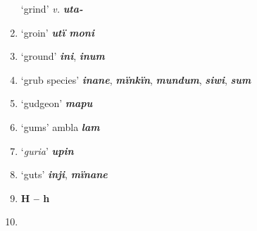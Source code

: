 \begin{enumerate}[noitemsep, label={}, align=left, widest=190, labelsep=1ex,leftmargin=*,itemindent=-10pt]
‘grind’ \textit{v.} \textbf{\textit{uta-}} \item
‘groin’ \textbf{\textit{utï moni}} \item
‘ground’ \textbf{\textit{ini}}, \textbf{\textit{inum}} \item
‘grub species’ \textbf{\textit{inane}}, \textbf{\textit{mïnkïn}}, \textbf{\textit{mundum}}, \textbf{\textit{siwi}}, \textbf{\textit{sum}} \item
‘gudgeon’ \textbf{\textit{mapu}} \item
‘gums’ ambla \textbf{\textit{lam}} \item
‘\textit{guria}’ \textbf{\textit{upin}} \item
‘guts’ \textbf{\textit{inji}}, \textbf{\textit{mïnane}}\\ \item

\noindent \textbf{H – h}\\ \item


\end{enumerate}
